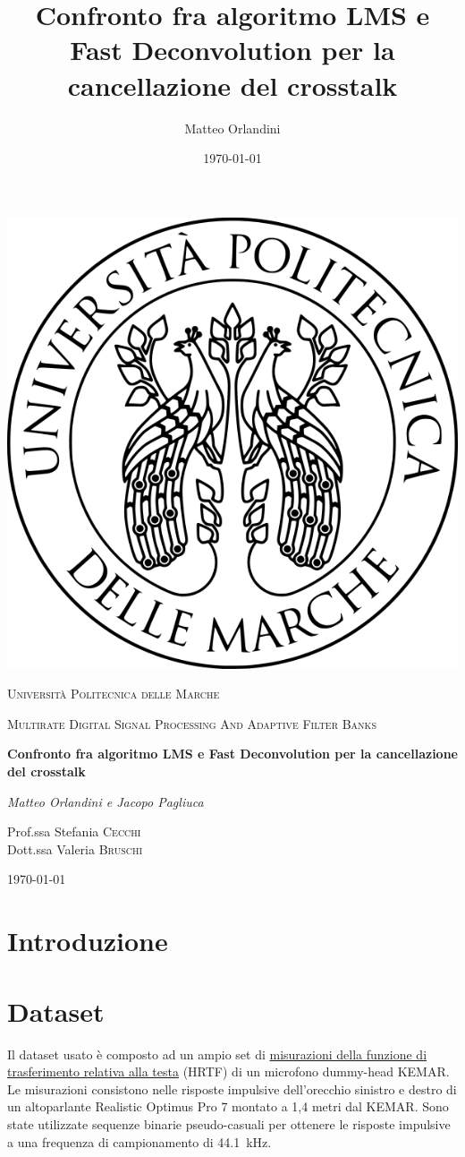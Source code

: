 \documentclass[12pt,a4paper,titlepage]{article}
\title{Confronto fra algoritmo LMS e Fast Deconvolution per la cancellazione del crosstalk}
\author{Matteo Orlandini}
\date{\today}
\begin{document}
\begin{titlepage}
	
	\centering
	\includegraphics[width=.2\textwidth]{Immagini/univpmlogo}\par\vspace{1cm}
	{\scshape\LARGE Università Politecnica delle Marche\par}
	\vspace{1cm}
	{\scshape\Large Multirate Digital Signal Processing And Adaptive Filter Banks \par}
	\vspace{1.5cm}
	{\huge\bfseries Confronto fra algoritmo LMS e Fast Deconvolution per la cancellazione del crosstalk \par}
	\vspace{2cm}
	{\Large\itshape Matteo Orlandini e Jacopo Pagliuca\par}
	\vfill
	Prof.ssa Stefania \textsc{Cecchi}\\
	Dott.ssa Valeria \textsc{Bruschi}
	
	\vfill
	
	{\large \today\par}
\end{titlepage}

\thispagestyle{empty}
\tableofcontents

\newpage
\setcounter{page}{1}
\section{Introduzione}
\label{sec:Introduzione}
\clearpage

\section{Dataset}
\label{sec:Dataset}
Il dataset usato è composto ad un ampio set di \href{http://sound.media.mit.edu/resources/KEMAR/full.zip}{misurazioni della funzione di trasferimento relativa alla testa} (HRTF) di un microfono dummy-head KEMAR. Le misurazioni consistono nelle risposte impulsive dell'orecchio sinistro e destro di un altoparlante Realistic Optimus Pro 7 montato a 1,4 metri dal KEMAR. Sono state utilizzate sequenze binarie pseudo-casuali per ottenere le risposte impulsive a una frequenza di campionamento di \SI{44.1}{\kilo \hertz}. \cite{Gardner:HRTF}
\end{document}
